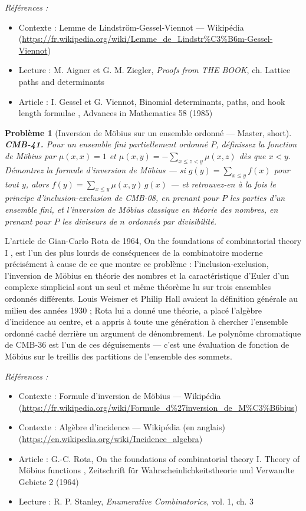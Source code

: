 \documentclass[11pt]{article}
\newtheorem{problem}{Problème}
\newenvironment{refs}{\par\small\noindent\emph{Références :}\begin{itemize}\setlength\itemsep{0pt}}{\end{itemize}\normalsize}
\begin{document}
\begin{refs}
\item Contexte : Lemme de Lindström-Gessel-Viennot --- Wikipédia (\url{https://fr.wikipedia.org/wiki/Lemme_de_Lindstr%C3%B6m-Gessel-Viennot})
\item Lecture : M. Aigner et G. M. Ziegler, \textit{Proofs from THE BOOK}, ch. \og{} Lattice paths and determinants \fg{}
\item Article : I. Gessel et G. Viennot, \og{} Binomial determinants, paths, and hook length formulae \fg{}, Advances in Mathematics 58 (1985)
\end{refs}

\bigskip

\begin{problem}[{Inversion de Möbius sur un ensemble ordonné --- Master, short}]
\textbf{CMB-41.} Pour un ensemble fini partiellement ordonné $ P $, définissez la fonction de Möbius par $ \mu(x,x) = 1 $ et $ \mu(x,y) = -\sum_{x \le z < y} \mu(x,z) $ dès que $ x < y $. Démontrez la formule d'inversion de Möbius --- si $ g(y) = \sum_{x \le y} f(x) $ pour tout $ y $, alors $ f(y) = \sum_{x \le y} \mu(x,y)\, g(x) $ --- et retrouvez-en à la fois le principe d'inclusion-exclusion de CMB-08, en prenant pour $ P $ les parties d'un ensemble fini, et l'inversion de Möbius classique en théorie des nombres, en prenant pour $ P $ les diviseurs de $ n $ ordonnés par divisibilité.
\end{problem}

\noindent L'article de Gian-Carlo Rota de 1964, \og{} On the foundations of combinatorial theory I \fg{}, est l'un des plus lourds de conséquences de la combinatoire moderne précisément à cause de ce que montre ce problème : l'inclusion-exclusion, l'inversion de Möbius en théorie des nombres et la caractéristique d'Euler d'un complexe simplicial sont un seul et même théorème lu sur trois ensembles ordonnés différents. Louis Weisner et Philip Hall avaient la définition générale au milieu des années 1930 ; Rota lui a donné une théorie, a placé l'algèbre d'incidence au centre, et a appris à toute une génération à chercher l'ensemble ordonné caché derrière un argument de dénombrement. Le polynôme chromatique de CMB-36 est l'un de ces déguisements --- c'est une évaluation de fonction de Möbius sur le treillis des partitions de l'ensemble des sommets.

\begin{refs}
\item Contexte : Formule d'inversion de Möbius --- Wikipédia (\url{https://fr.wikipedia.org/wiki/Formule_d%27inversion_de_M%C3%B6bius})
\item Contexte : Algèbre d'incidence --- Wikipédia (en anglais) (\url{https://en.wikipedia.org/wiki/Incidence_algebra})
\item Article : G.-C. Rota, \og{} On the foundations of combinatorial theory I. Theory of Möbius functions \fg{}, Zeitschrift für Wahrscheinlichkeitstheorie und Verwandte Gebiete 2 (1964)
\item Lecture : R. P. Stanley, \textit{Enumerative Combinatorics}, vol. 1, ch. 3
\end{refs}
\end{document}
